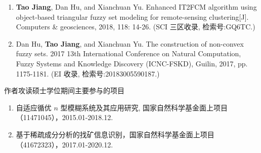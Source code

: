 \begin{paper}
\begin{enumerate}
  \item \textbf{Tao Jiang}, Dan Hu, and Xianchuan Yu.  Enhanced IT2FCM algorithm using object-based triangular fuzzy set modeling for remote-sensing clustering[J]. Computers \& geosciences, 2018, 118: 14-26. (SCI 三区收录, 检索号:GQ6TC.)
  \item Dan Hu, \textbf{Tao Jiang}, and Xianchuan Yu. The construction of non-convex fuzzy sets. 2017 13th International Conference on Natural Computation, Fuzzy Systems and Knowledge  Discovery (ICNC-FSKD), Guilin, 2017, pp. 1175-1181. (EI 收录, 检索号:20183005590187.)\\
  \end{enumerate}

\end{paper}





\begin{center}
  \large 作者攻读硕士学位期间主要参与的项目
\end{center}

\begin{enumerate}[(1)]
\item 自适应循优 $n$ 型模糊系统及其应用研究, 国家自然科学基金面上项目（11471045），2015.01-2018.12.

\item 基于稀疏成分分析的找矿信息识别，国家自然科学基金面上项目（41672323），2017.01-2020.12.

\end{enumerate}

